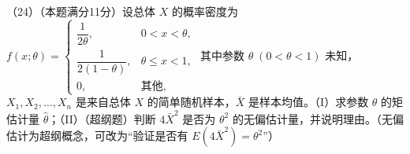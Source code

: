 \documentclass[UTF8,12pt]{ctexart}
\begin{document}
（24）（本题满分11分）设总体 \(\displaystyle X\) 的概率密度为 \(\displaystyle f(x;\theta)=\begin{cases}\dfrac{\displaystyle 1}{\displaystyle 2\theta},\allowbreak &0<x<\theta,\allowbreak \\\dfrac{\displaystyle 1}{\displaystyle 2(1-\theta)},\allowbreak &\theta\le x<1,\allowbreak \\0,\allowbreak &\text{其他},\allowbreak \end{cases}\) 其中参数 \(\displaystyle \theta\;(0<\theta<1)\) 未知，\(\displaystyle X_1,\allowbreak X_2,\allowbreak \ldots,\allowbreak X_n\) 是来自总体 \(\displaystyle X\) 的简单随机样本，\(\displaystyle \bar X\) 是样本均值。（I）求参数 \(\displaystyle \theta\) 的矩估计量 \(\displaystyle \hat\theta\)；（II）（超纲题）判断 \(\displaystyle 4\bar X^2\) 是否为 \(\displaystyle \theta^2\) 的无偏估计量，并说明理由。（无偏估计为超纲概念，可改为“验证是否有 \(\displaystyle E(4\bar X^2)=\theta^2\)”）
\end{document}
